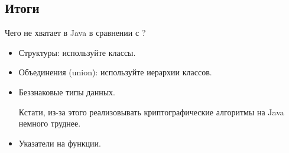 \subsection{Итоги}


Чего не хватает в Java в сравнении с \CCpp?

\begin{itemize}
\item Структуры: используйте классы.

\item Объединения (union): используйте иерархии классов.

\item Беззнаковые типы данных.

Кстати, из-за этого реализовывать криптографические алгоритмы на Java немного труднее.

\item Указатели на функции.
\end{itemize}
